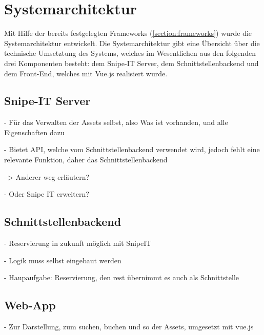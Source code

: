 \section{Systemarchitektur}
Mit Hilfe der bereits festgelegten Frameworks (\ref{section:frameworks}) wurde
die Systemarchitektur entwickelt. Die Systemarchitektur gibt eine Übersicht über
die technische Umsetztung des Systems, welches im Wesentlichen aus den folgenden
drei Komponenten besteht: dem Snipe-IT Server, dem Schnittstellenbackend und dem
Front-End, welches mit Vue.js realisiert wurde.

\subsection{Snipe-IT Server}

- Für das Verwalten der Assets selbst, also Was ist vorhanden, und alle
Eigenschaften dazu

- Bietet API, welche vom Schnittstellenbackend verwendet wird, jedoch fehlt eine
relevante Funktion, daher das Schnittstellenbackend

--> Anderer weg erläutern?

- Oder Snipe IT erweitern?

\subsection{Schnittstellenbackend}
- Reservierung in zukunft möglich mit SnipeIT

- Logik muss selbst eingebaut werden

- Haupaufgabe: Reservierung, den rest übernimmt es auch als Schnittstelle

\subsection{Web-App}
- Zur Darstellung, zum suchen, buchen und so der Assets, umgesetzt mit vue.js

